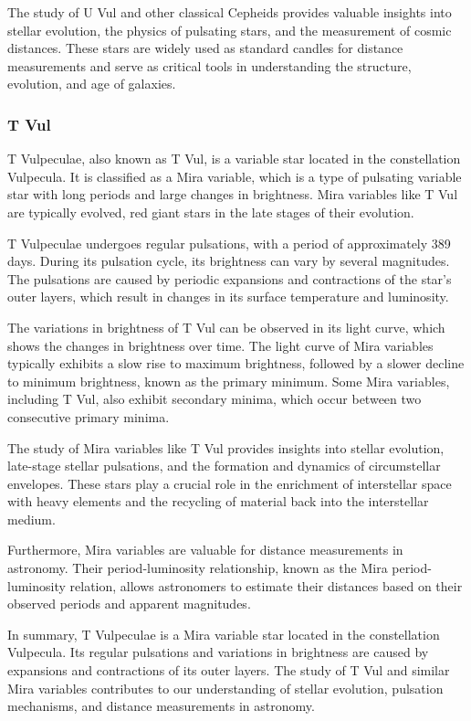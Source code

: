 The study of U Vul and other classical Cepheids provides valuable insights into stellar evolution, the physics of pulsating stars, and the measurement of cosmic distances. These stars are widely used as standard candles for distance measurements and serve as critical tools in understanding the structure, evolution, and age of galaxies.

\subsubsection*{ T Vul }
T Vulpeculae, also known as T Vul, is a variable star located in the constellation Vulpecula. It is classified as a Mira variable, which is a type of pulsating variable star with long periods and large changes in brightness. Mira variables like T Vul are typically evolved, red giant stars in the late stages of their evolution.

T Vulpeculae undergoes regular pulsations, with a period of approximately 389 days. During its pulsation cycle, its brightness can vary by several magnitudes. The pulsations are caused by periodic expansions and contractions of the star's outer layers, which result in changes in its surface temperature and luminosity.

The variations in brightness of T Vul can be observed in its light curve, which shows the changes in brightness over time. The light curve of Mira variables typically exhibits a slow rise to maximum brightness, followed by a slower decline to minimum brightness, known as the primary minimum. Some Mira variables, including T Vul, also exhibit secondary minima, which occur between two consecutive primary minima.

The study of Mira variables like T Vul provides insights into stellar evolution, late-stage stellar pulsations, and the formation and dynamics of circumstellar envelopes. These stars play a crucial role in the enrichment of interstellar space with heavy elements and the recycling of material back into the interstellar medium.

Furthermore, Mira variables are valuable for distance measurements in astronomy. Their period-luminosity relationship, known as the Mira period-luminosity relation, allows astronomers to estimate their distances based on their observed periods and apparent magnitudes.

In summary, T Vulpeculae is a Mira variable star located in the constellation Vulpecula. Its regular pulsations and variations in brightness are caused by expansions and contractions of its outer layers. The study of T Vul and similar Mira variables contributes to our understanding of stellar evolution, pulsation mechanisms, and distance measurements in astronomy.


